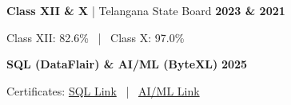 \documentclass[10pt,a4paper]{article}
\begin{document}
\vspace{5pt}

\noindent
\begin{minipage}[t]{0.50\textwidth}
\textbf{Class XII \& X} | Telangana State Board \hfill \textbf{2023 \& 2021} \par
\vspace{1pt}
{\small Class XII: 82.6\% \ | \ Class X: 97.0\%}
\end{minipage}
\hfill
\begin{minipage}[t]{0.46\textwidth}
\textbf{SQL (DataFlair) \& AI/ML (ByteXL)} \hfill \textbf{2025} \par
\vspace{1pt}
{\small Certificates: \href{https://drive.google.com/file/d/1oosWCwBwj4BE8eseplqIj-2Cx2dp42X3/view?usp=sharing}{SQL Link} \ | \ \href{https://drive.google.com/file/d/1Didyx_p9tVhQ_uAG6CP7Sf4VfBXdAbES/view?usp=sharing}{AI/ML Link}}
\end{minipage}
\end{document}
